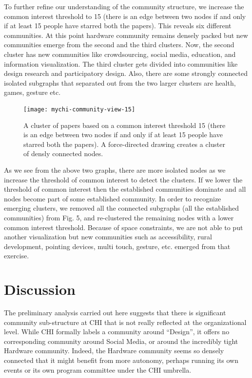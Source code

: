 \documentclass{sigchi}
\begin{document}
To further refine our understanding of the community structure, we increase the common interest threshold to 15 (there is an edge between two nodes if and only if at least 15 people have starred both the papers). This reveals six different communities. At this point hardware community remains densely packed but new communities emerge from the second and the third clusters. Now, the second cluster has new communities like crowdsourcing, social media, education, and information visualization. The third cluster gets divided into communities like design research and participatory design. Also, there are some strongly connected isolated subgraphs that separated out from the two larger clusters are health, games, gesture etc.




\begin{figure}[!h]
\centering
\texttt{[image: mychi-community-view-15]}
\caption{A cluster of papers based on a common interest threshold 15 (there is an edge between two nodes if and only if at least 15 people have starred both the papers). A force-directed drawing creates a cluster of densly connected nodes. }
\label{Community View of threshold 15}
\end{figure}

As we see from the above two graphs, there are more isolated nodes as we increase the threshold of common interest to detect the clusters. If we lower the threshold of common interest then the established communities dominate and all nodes become part of some established community.  In order to recognize emerging clusters, we removed all the connected subgraphs (all the established communities) from Fig. 5, and re-clustered the remaining nodes with a lower common interest threshold. Because of space constraints, we are not able to put another visualization but new communities such as accessibility, rural development, pointing devices, multi touch, gesture, etc. emerged from that exercise.




\section{Discussion}
The preliminary analysis carried out here suggests that there is significant community sub-structure at CHI that is not really reflected at the organizational level.  While CHI formally labels a community around “Design”, it offers no corresponding community around Social Media, or around the incredibly tight Hardware community.  Indeed, the Hardware community seems so densely connected that it might benefit from more autonomy, perhaps running its own events or its own program committee under the CHI umbrella.  
\end{document}
